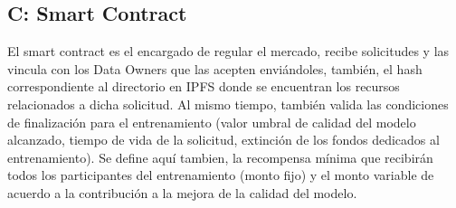 \documentclass[
11pt, %
oneside, %
spanish, %
singlespacing, %
parskip, %
headsepline, %
chapterinoneline, %
]{MastersDoctoralThesis} %
\begin{document}
\subsection*{\textbf{C:} Smart Contract}
El smart contract es el encargado de regular el mercado, recibe solicitudes y las vincula con los Data Owners que las acepten enviándoles, también, el hash correspondiente al directorio en IPFS donde se encuentran los recursos relacionados a dicha solicitud. Al mismo tiempo, también valida las condiciones de finalización para el entrenamiento (valor umbral de calidad del modelo alcanzado, tiempo de vida de la solicitud, extinción de los fondos dedicados al entrenamiento).
Se define aquí tambien, la recompensa mínima que recibirán todos los participantes del entrenamiento (monto fijo) y el monto variable de acuerdo a la contribución a la mejora de la calidad del modelo.





\printbibliography[heading=bibnumbered, title=Referencias]

\end{document}
